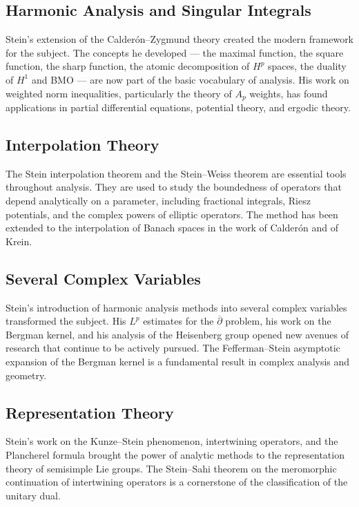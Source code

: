 \subsection{Harmonic Analysis and Singular Integrals}

Stein's extension of the Calder\'on--Zygmund theory created the modern framework for the subject. The concepts he developed --- the maximal function, the square function, the sharp function, the atomic decomposition of \(H^p\) spaces, the duality of \(H^1\) and BMO --- are now part of the basic vocabulary of analysis. His work on weighted norm inequalities, particularly the theory of \(A_p\) weights, has found applications in partial differential equations, potential theory, and ergodic theory.

\subsection{Interpolation Theory}

The Stein interpolation theorem and the Stein--Weiss theorem are essential tools throughout analysis. They are used to study the boundedness of operators that depend analytically on a parameter, including fractional integrals, Riesz potentials, and the complex powers of elliptic operators. The method has been extended to the interpolation of Banach spaces in the work of Calder\'on and of Krein.

\subsection{Several Complex Variables}

Stein's introduction of harmonic analysis methods into several complex variables transformed the subject. His \(L^p\) estimates for the \(\overline{\partial}\) problem, his work on the Bergman kernel, and his analysis of the Heisenberg group opened new avenues of research that continue to be actively pursued. The Fefferman--Stein asymptotic expansion of the Bergman kernel is a fundamental result in complex analysis and geometry.

\subsection{Representation Theory}

Stein's work on the Kunze--Stein phenomenon, intertwining operators, and the Plancherel formula brought the power of analytic methods to the representation theory of semisimple Lie groups. The Stein--Sahi theorem on the meromorphic continuation of intertwining operators is a cornerstone of the classification of the unitary dual.

